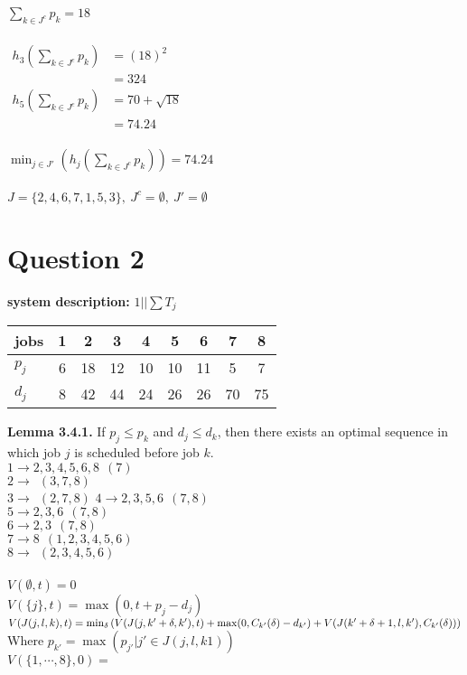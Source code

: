 \documentclass[a4paper, fleqn]{article}
\begin{document}
\vspace{1pt}
$\sum_{k\in J^c}p_k=18$\\
\vspace{1pt}\\
$\begin{aligned}h_3\left(\sum_{k\in J^c}p_k\right)&=(18)^2\\&=324\end{aligned}$\\
$\begin{aligned}h_5\left(\sum_{k\in J^c}p_k\right)&=70+\sqrt{18}\\&=74.24\end{aligned}$\\
\vspace{1pt}\\
$\min_{j\in J'}\left(h_j\left(\sum_{k\in J^c}p_k\right)\right)=74.24$\\
\vspace{1pt}\\
$J=\{2,4,6,7,1,5,3\},\ J^c=\emptyset,\ J'=\emptyset$
\section{Question 2}
\textbf{system description: }$1||\sum T_j$
\begin{center}
\begin{tabular}{| l | c | c | c | c | c | c | c | c |}
\hline
jobs & 1 & 2 & 3 & 4 & 5 & 6 & 7 & 8\\
\hline
$p_j$ & 6 & 18 & 12 & 10 & 10 & 11 & 5 & 7 \\
$d_j$ & 8 & 42 & 44 & 24 & 26 & 26 & 70 & 75 \\
\hline
\end{tabular}
\end{center}
\textbf{Lemma 3.4.1.} If $p_j\leq p_k$ and $d_j\leq d_k$, then there exists an optimal sequence in which job $j$ is scheduled before job $k$.\\
$1\rightarrow2,3,4,5,6,8\ \ (7)$\\
$2\rightarrow\ \ (3,7,8)$\\
$3\rightarrow\ \ (2,7,8)$
$4\rightarrow2,3,5,6\ \ (7,8)$\\
$5\rightarrow2,3,6\ \ (7,8)$\\
$6\rightarrow2,3\ \ (7,8)$\\
$7\rightarrow8\ \ (1,2,3,4,5,6)$\\
$8\rightarrow\ \ (2,3,4,5,6)$\\
\vspace{1pt}\\
$V(\emptyset,t)=0$\\
$V(\{j\},t)=\max(0,t+p_j-d_j)$\\
$V(J(j,l,k),t)\\=\min_{\delta}\left(V(J(j,k'+\delta,k'),t)+\max(0,C_{k'}(\delta)-d_{k'})+V(J(k'+\delta+1,l,k'),C_{k'}(\delta))\right)$\\
Where $p_{k'}=\max\left(p_{j'}|j'\in J(j,l,k1)\right)$\\
$V(\{1,\cdots,8\},0)=$
\end{document}
